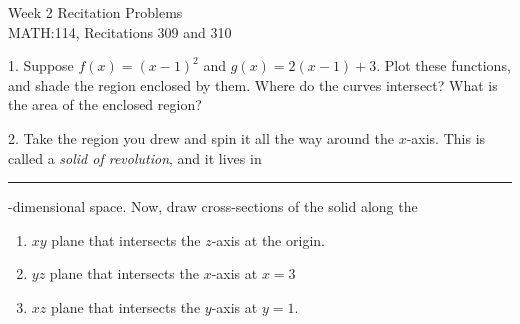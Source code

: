 \documentclass[11pt]{article}
\begin{document}
	{
		\centering
		\huge{Week 2 Recitation Problems} \\
		\Large{MATH:114, Recitations 309 and 310} \\
	}
	
	\vspace{3em}
	
	1. Suppose $f(x)=(x-1)^2$ and $g(x)=2(x-1)+3$. Plot these functions, and shade the region enclosed by them. Where do the curves intersect? What is the area of the enclosed region?
	
	\vspace{20em}
	
	2. Take the region you drew and spin it all the way around the $x$-axis. This is called a \textit{solid of revolution}, and it lives in \rule{1em}{1pt}-dimensional space. Now, draw cross-sections of the solid along the
		\begin{enumerate}[label=(\alph*)]
			\item $xy$ plane that intersects the $z$-axis at the origin.
			\item $yz$ plane that intersects the $x$-axis at $x=3$
			\item $xz$ plane that intersects the $y$-axis at $y=1$.
		\end{enumerate}
		\vspace{2em}
		
\end{document}
